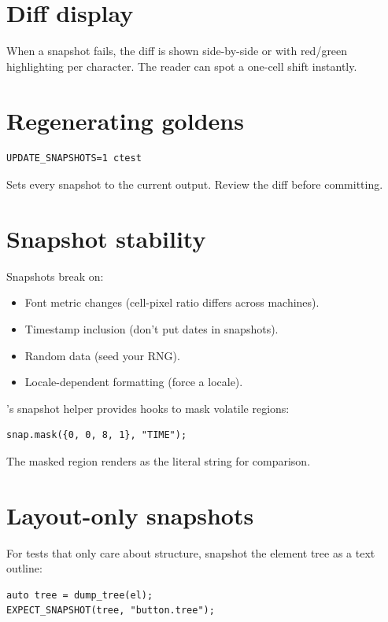 \section{Diff display}

When a snapshot fails, the diff is shown side-by-side or
with red/green highlighting per character. The reader can
spot a one-cell shift instantly.

\section{Regenerating goldens}

\begin{lstlisting}
UPDATE_SNAPSHOTS=1 ctest
\end{lstlisting}

Sets every snapshot to the current output. Review the diff
before committing.

\section{Snapshot stability}

Snapshots break on:

\begin{itemize}[leftmargin=*]
  \item Font metric changes (cell-pixel ratio differs across
    machines).
  \item Timestamp inclusion (don't put dates in snapshots).
  \item Random data (seed your RNG).
  \item Locale-dependent formatting (force a locale).
\end{itemize}

\maya{}'s snapshot helper provides hooks to mask volatile
regions:

\begin{lstlisting}
snap.mask({0, 0, 8, 1}, "TIME");
\end{lstlisting}

The masked region renders as the literal string for
comparison.

\section{Layout-only snapshots}

For tests that only care about structure, snapshot the
element tree as a text outline:

\begin{lstlisting}
auto tree = dump_tree(el);
EXPECT_SNAPSHOT(tree, "button.tree");
\end{lstlisting}

